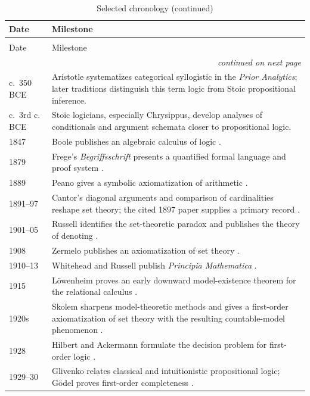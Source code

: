 \begin{longtable}{@{}p{}p{}@{}}
\caption{Selected chronology}\\
\toprule
Date & Milestone \\
\midrule
\endfirsthead
\caption[]{Selected chronology (continued)}\\
\toprule
Date & Milestone \\
\midrule
\endhead
\midrule\multicolumn{2}{r}{\emph{continued on next page}}\\
\endfoot
\endlastfoot
c.~350 BCE & Aristotle systematizes categorical syllogistic in the
\emph{Prior Analytics}; later traditions distinguish this term logic from
Stoic propositional inference. \\
c.~3rd c. BCE & Stoic logicians, especially Chrysippus, develop analyses of
conditionals and argument schemata closer to propositional logic. \\
1847 & Boole publishes an algebraic calculus of logic \cite{Boole1847}. \\
1879 & Frege's \emph{Begriffsschrift} presents a quantified formal language and
proof system \cite{Frege1879}. \\
1889 & Peano gives a symbolic axiomatization of arithmetic \cite{Peano1889}. \\
1891--97 & Cantor's diagonal arguments and comparison of cardinalities reshape
set theory; the cited 1897 paper supplies a primary record \cite{Cantor1897}. \\
1901--05 & Russell identifies the set-theoretic paradox and publishes the
theory of denoting \cite{Russell1905}. \\
1908 & Zermelo publishes an axiomatization of set theory \cite{Zermelo1908}. \\
1910--13 & Whitehead and Russell publish \emph{Principia Mathematica}
\cite{WhiteheadRussell1910}. \\
1915 & L\"owenheim proves an early downward model-existence theorem for the
relational calculus \cite{Lowenheim1915}. \\
1920s & Skolem sharpens model-theoretic methods and gives a first-order
axiomatization of set theory with the resulting countable-model phenomenon
\cite{Skolem1923}. \\
1928 & Hilbert and Ackermann formulate the decision problem for first-order
logic \cite{HilbertAckermann1928}. \\
1929--30 & Glivenko relates classical and intuitionistic propositional logic;
G\"odel proves first-order completeness \cite{Glivenko1929,Godel1930}. \\

\end{longtable}
